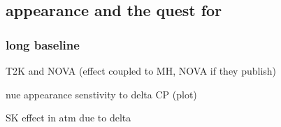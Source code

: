 \subsection{\nue appearance and the quest for \dcp}


\subsubsection{ long baseline}

T2K and NOVA (effect coupled to MH, NOVA if they publish)

nue appearance senstivity to delta CP (plot)

SK effect in atm due to delta